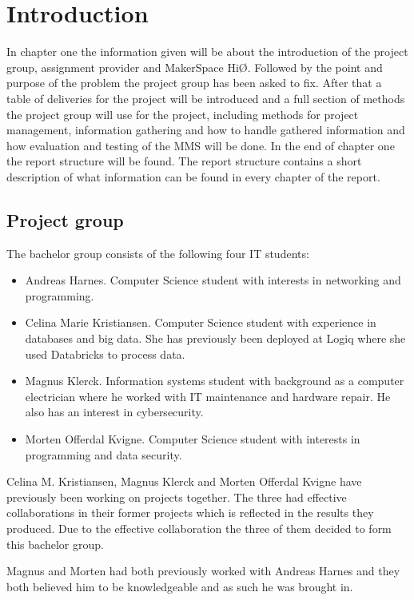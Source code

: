 \chapter{Introduction} 
In chapter one the information given will be about the introduction of the project group, assignment provider and MakerSpace HiØ. Followed by the point and purpose of the problem the project group has been asked to fix. After that a table of deliveries for the project will be introduced and a full section of methods the project group will use for the project, including methods for project management, information gathering and how to handle gathered information and how evaluation and testing of the MMS will be done. In the end of chapter one the report structure will be found. The report structure contains a short description of what information can be found in every chapter of the report.            
\section{Project group}
The bachelor group consists of the following four IT students:
\begin{itemize}
    \item Andreas Harnes. 
    Computer Science student with interests in networking and programming.
    \item Celina Marie Kristiansen.
    Computer Science student with experience in databases and big data.
    She has previously been deployed at Logiq where she used Databricks to process data.
    \item Magnus Klerck.
    Information systems student with background as a computer electrician where he worked with IT maintenance and hardware repair.
    He also has an interest in cybersecurity.
    \item Morten Offerdal Kvigne.
    Computer Science student with interests in programming and data security.
\end{itemize}
Celina M. Kristiansen, Magnus Klerck and Morten Offerdal Kvigne have previously been working on projects together.
The three had effective collaborations in their former projects which is reflected in the results they produced.
Due to the effective collaboration the three of them decided to form this bachelor group.

Magnus and Morten had both previously worked with Andreas Harnes and they both believed him to be knowledgeable and as such he was brought in.

